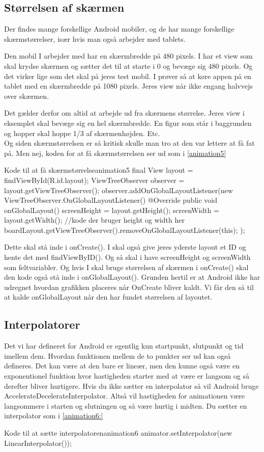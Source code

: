 \subsection{Størrelsen af skærmen}
Der findes mange forskellige Android mobiler, og de har mange forskellige skærmstørrelser, især hvis man også arbejder med tablets. 
\begin{example}
	Den mobil I arbejder med har en skærmbredde på 480 pixels. I har et view som skal krydse skærmen og sætter det til at starte i 0 og bevæge sig 480 pixels. Og det virker lige som det skal på jeres test mobil. I prøver så at køre appen på en tablet med en skærmbredde på 1080 pixels. Jeres view når ikke engang halvvejs over skærmen. 
\end{example}
Det gælder derfor om altid at arbejde ud fra skærmens størrelse. Jeres view i eksemplet skal bevæge sig en hel skærmbredde. En figur som står i baggrunden og hopper skal hoppe 1/3 af skærmenhøjden. Etc.\\

Og siden skærmstørrelsen er så kritisk skulle man tro at den var lettere at få fat på. Men nej, koden for at få skærmstørrelsen ser ud som i \autoref{animation5}
\begin{JavaCode}{Kode til at få skærmstørrelse}{animation5}
	final View layout = findViewById(R.id.layout);
	ViewTreeObserver observer = layout.getViewTreeObserver();
	observer.addOnGlobalLayoutListener(new ViewTreeObserver.OnGlobalLayoutListener() {
		@Override
		public void onGlobalLayout() {
			screenHeight = layout.getHeight();
			screenWidth = layout.getWidth();
			//kode der bruger height og width her
			boardLayout.getViewTreeObserver().removeOnGlobalLayoutListener(this);
		}
	});
\end{JavaCode}

Dette skal stå inde i onCreate(). I skal også give jeres yderste layout et ID og hente det med findViewByID(). Og så skal i have screenHeight og screenWidth som feltvariabler. Og hvis I skal bruge størrelsen af skærmen i onCreate() skal den kode også stå inde i onGlobalLayout().
Grunden hertil er at Android ikke har udregnet hvordan grafikken placeres når OnCreate bliver kaldt. Vi får den så til at kalde onGlobalLayout når den har fundet størrelsen af layoutet.
\subsection{Interpolatorer}
Det vi har defineret for Android er egentlig kun startpunkt, slutpunkt og tid imellem dem. Hvordan funktionen mellem de to punkter ser ud kan også defineres. Det kan være at den bare er lineær, men den kunne også være en exponentionel funktion hvor hastigheden starter med at være er langsom og så derefter bliver hurtigere. 
Hvis du ikke sætter en interpolator så vil Android bruge AccelerateDecelerateInterpolator. Altså vil hastigheden for animationen være langsommere i starten og slutningen og så være hurtig i midten. Du sætter en interpolator som i \autoref{animation6:}
\begin{JavaCode}{Kode til at sætte interpolatoren}{animation6}
	animator.setInterpolator(new LinearInterpolator());
\end{JavaCode}

